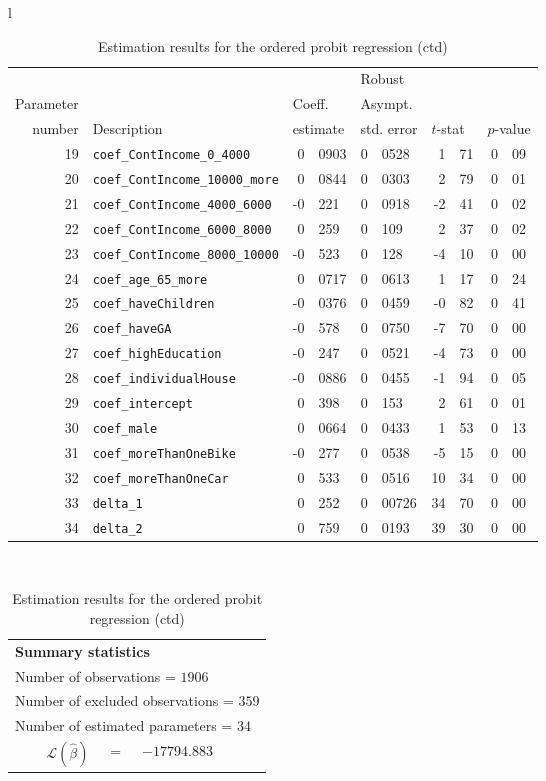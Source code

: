 \documentclass[12pt,a4paper]{article}
\begin{document}
\begin{table}[htb]
\caption{\label{tab:ordered2}Estimation results for the ordered probit
  regression (ctd)}
  \begin{tabular}{l}
\begin{tabular}{rlr@{.}lr@{.}lr@{.}lr@{.}l}
         &                       &   \multicolumn{2}{l}{}    & \multicolumn{2}{l}{Robust}  &     \multicolumn{4}{l}{}   \\
Parameter &                       &   \multicolumn{2}{l}{Coeff.}      & \multicolumn{2}{l}{Asympt.}  &     \multicolumn{4}{l}{}   \\
number &  Description                     &   \multicolumn{2}{l}{estimate}      & \multicolumn{2}{l}{std. error}  &   \multicolumn{2}{l}{$t$-stat}  &   \multicolumn{2}{l}{$p$-value}   \\

\hline
19 & \lstinline$coef_ContIncome_0_4000$ & 0&0903 & 0&0528 & 1&71 & 0&09\\
20 & \lstinline$coef_ContIncome_10000_more$ & 0&0844 & 0&0303 & 2&79 & 0&01\\
21 & \lstinline$coef_ContIncome_4000_6000$ & -0&221 & 0&0918 & -2&41 & 0&02\\
22 & \lstinline$coef_ContIncome_6000_8000$ & 0&259 & 0&109 & 2&37 & 0&02\\
23 & \lstinline$coef_ContIncome_8000_10000$ & -0&523 & 0&128 & -4&10 & 0&00\\
24 & \lstinline$coef_age_65_more$ & 0&0717 & 0&0613 & 1&17 & 0&24\\
25 & \lstinline$coef_haveChildren$ & -0&0376 & 0&0459 & -0&82 & 0&41\\
26 & \lstinline$coef_haveGA$ & -0&578 & 0&0750 & -7&70 & 0&00\\
27 & \lstinline$coef_highEducation$ & -0&247 & 0&0521 & -4&73 & 0&00\\
28 & \lstinline$coef_individualHouse$ & -0&0886 & 0&0455 & -1&94 & 0&05\\
29 & \lstinline$coef_intercept$ & 0&398 & 0&153 & 2&61 & 0&01\\
30 & \lstinline$coef_male$ & 0&0664 & 0&0433 & 1&53 & 0&13\\
31 & \lstinline$coef_moreThanOneBike$ & -0&277 & 0&0538 & -5&15 & 0&00\\
32 & \lstinline$coef_moreThanOneCar$ & 0&533 & 0&0516 & 10&34 & 0&00\\
33 & \lstinline$delta_1$ & 0&252 & 0&00726 & 34&70 & 0&00\\
34 & \lstinline$delta_2$ & 0&759 & 0&0193 & 39&30 & 0&00\\
\hline
\end{tabular}
\\
\begin{tabular}{rcl}
\multicolumn{3}{l}{\bf Summary statistics}\\
\multicolumn{3}{l}{ Number of observations = $1906$} \\
\multicolumn{3}{l}{ Number of excluded observations = $359$} \\
\multicolumn{3}{l}{ Number of estimated  parameters = $34$} \\
 $\mathcal{L}(\hat{\beta})$ &=& $-17794.883 $  \\


\end{tabular}
\end{tabular}
\end{table}
\end{document}
